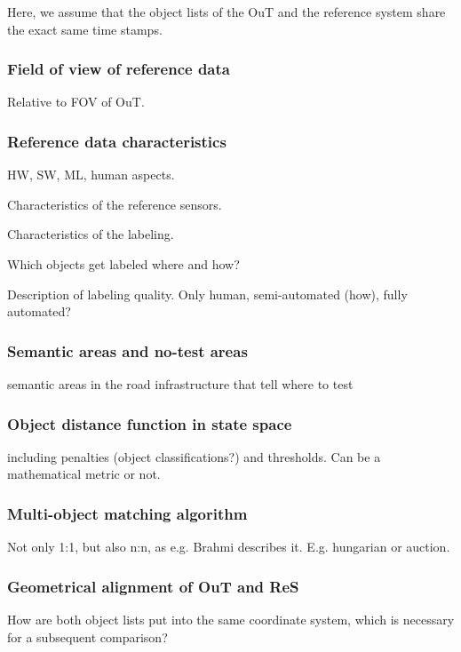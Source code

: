 \documentclass[conference]{IEEEtran}
\begin{document}
Here, we assume that the object lists of the OuT and the reference system share the exact same time stamps. 

\subsubsection{Field of view of reference data}
\label{sec:fov_ref}
Relative to FOV of OuT.

\subsubsection{Reference data characteristics}
\label{sec:ref_data}

HW, SW, ML, human aspects.

Characteristics of the reference sensors.

Characteristics of the labeling.

Which objects get labeled where and how?

Description of labeling quality. Only human, semi-automated (how), fully automated?


\subsubsection{Semantic areas and no-test areas}
\label{sec:semantic_areas}
semantic areas in the road infrastructure that tell where to test

\subsubsection{Object distance function in state space}
\label{sec:distance_function}
including penalties (object classifications?) and thresholds. 
Can be a mathematical metric or not. 

\subsubsection{Multi-object matching algorithm}
\label{sec:multi_object_matching}
Not only 1:1, but also n:n, as e.g. Brahmi \cite[Sec. 10.3]{Brahmi2020diss} describes it. E.g. hungarian or auction. 


\subsubsection{Geometrical alignment of OuT and ReS}
How are both object lists put into the same coordinate system, which is necessary for a subsequent comparison?
\end{document}
